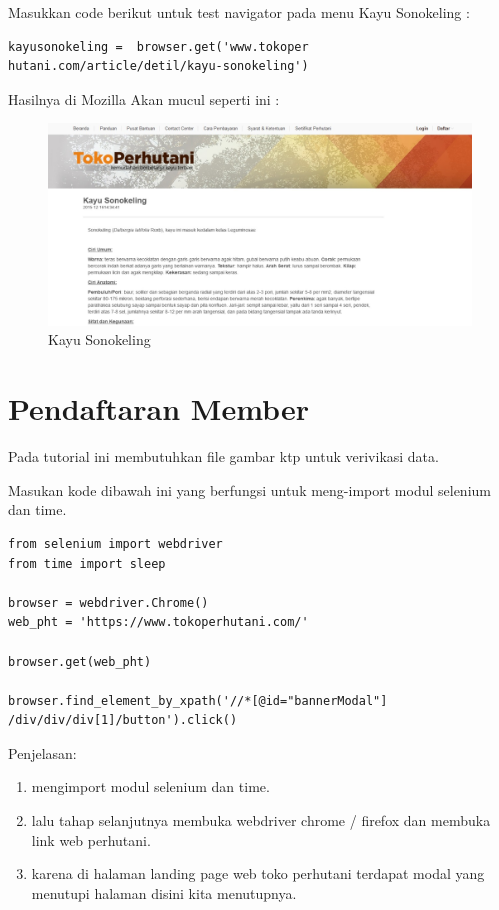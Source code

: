 Masukkan code berikut untuk test navigator pada menu Kayu Sonokeling :
\begin{verbatim}
kayusonokeling =  browser.get('www.tokoper
hutani.com/article/detil/kayu-sonokeling')
\end{verbatim}

Hasilnya  di Mozilla Akan mucul seperti ini :
\begin{figure}[h]
	\centering
	\includegraphics[scale=0.25]{figures/j3}
	\caption{Kayu Sonokeling}
\end{figure}

\newpage
\section{Pendaftaran Member}
Pada tutorial ini membutuhkan file gambar ktp untuk verivikasi data.

Masukan kode dibawah ini yang berfungsi untuk meng-import modul selenium dan time.
\begin{verbatim}
from selenium import webdriver
from time import sleep

browser = webdriver.Chrome()
web_pht = 'https://www.tokoperhutani.com/'

browser.get(web_pht)

browser.find_element_by_xpath('//*[@id="bannerModal"]
/div/div/div[1]/button').click()

\end{verbatim}

Penjelasan:
\begin{enumerate}
	\item mengimport modul selenium dan time.
	\item lalu tahap selanjutnya membuka webdriver chrome / firefox dan membuka link web perhutani.
	\item karena di halaman landing page web toko perhutani terdapat modal yang menutupi halaman disini kita menutupnya.
\end{enumerate}


